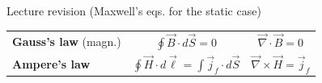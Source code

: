 \begin{frame}{Lecture \summarizedlecture revision (Maxwell's eqs. for the static case)}
{\begin{center}
{\begin{table}[H]
\begin{tabular}{|l|c|c|}
      {\bf Gauss's law} (magn.) &
        $\displaystyle \oint \vec{B} \cdot d\vec{S} = 0$ &
        $\displaystyle \vec{\nabla} \cdot \vec{B} = 0$ \\

      {\bf Ampere's law} &
        $\displaystyle \oint \vec{H} \cdot d\vec{\ell} =  \int \vec{j}_{f} \cdot d\vec{S}$ &
        $\displaystyle \vec{\nabla} \times \vec{H} = \vec{j}_{f}$ \\
      \hline
    \end{tabular}
  \end{table}
}
\end{center}
}

\end{frame}
